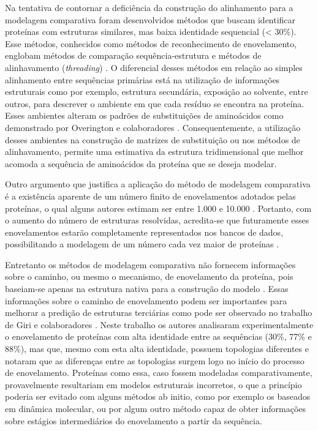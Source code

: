 Na tentativa de contornar a deficiência da construção do alinhamento para a modelagem comparativa foram desenvolvidos métodos que buscam identificar proteínas com estruturas similares, mas baixa identidade sequencial (< 30\%). Esse métodos, conhecidos como métodos de reconhecimento de enovelamento, englobam métodos de comparação sequência-estrutura e métodos de alinhavamento (\textit{threading}) \cite{Dunbrack:2001}. O diferencial desses métodos em relação ao simples alinhamento entre sequências primárias está na utilização de informações estruturais como por exemplo, estrutura secundária, exposição ao solvente, entre outros, para descrever o ambiente em que cada resíduo se encontra na proteína. Esses ambientes alteram os padrões de substituições de aminoácidos como demonstrado por Overington e colaboradores \cite{Overington:1984}. Consequentemente, a utilização desses ambientes na construção de matrizes de substituição ou nos métodos de alinhavamento, permite uma estimativa da estrutura tridimensional que melhor acomoda a sequência de aminoácidos da proteína que se deseja modelar.

Outro argumento que justifica a aplicação do método de modelagem comparativa é a existência aparente de um número finito de enovelamentos adotados pelas proteínas, o qual alguns autores estimam ser entre 1.000 e 10.000 \cite{Chothia:1987, Coulson:1997}. Portanto, com o aumento do número de estruturas resolvidas, acredita-se que futuramente esses enovelamentos estarão completamente representados nos bancos de dados, possibilitando a modelagem de um número cada vez maior de proteínas \cite{Kolodny:2008}.

Entretanto os métodos de modelagem comparativa não fornecem informações sobre o caminho, ou mesmo o mecanismo, de enovelamento da proteína, pois baseiam-se apenas na estrutura nativa para a construção do modelo \cite{Helles:2003}. Essas informações sobre o caminho de enovelamento podem ser importantes para melhorar a predição de estruturas terciárias como pode ser observado no trabalho de Giri e colaboradores \cite{Giri:2007}. Neste trabalho os autores analisaram experimentalmente o enovelamento de proteínas com alta identidade entre as sequências (30\%, 77\% e 88\%), mas que, mesmo com esta alta identidade, possuem topologias diferentes e notaram que as diferenças entre as topologias surgem logo no início do processo de enovelamento. Proteínas como essa, caso fossem modeladas comparativamente, provavelmente resultariam em modelos estruturais incorretos, o que a princípio poderia ser evitado com alguns métodos ab initio, como por exemplo os baseados em dinâmica molecular, ou por algum outro método capaz de obter informações sobre estágios intermediários do enovelamento a partir da sequência.

